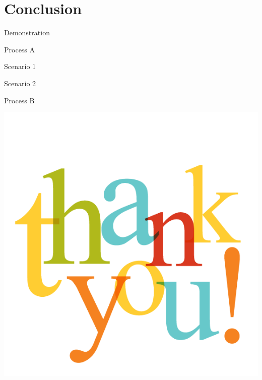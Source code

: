 \documentclass[presentation, aspectratio=169]{beamer}
\begin{document}
\section{Conclusion}


			
\begin{frame}{Demonstration}
	\begin{block}{Process A}
	\end{block}
	\begin{block}{Scenario 1}
	\end{block}
	\begin{alertblock}{Scenario 2}
	\end{alertblock}
	\begin{block}{Process B}
	\end{block}
	\note{}
\end{frame}
											 			
\begin{frame}
	\centering
	\includegraphics[width=.7\linewidth]{thankyou}
	\note{}
\end{frame}
					
\end{document}
